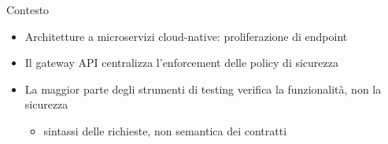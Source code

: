 
\begin{frame}{Contesto}
    \begin{itemize}
        \item Architetture a \alert{microservizi} cloud-native: \alert{proliferazione di endpoint}

        \item Il \alert{gateway API} centralizza l'enforcement delle policy di sicurezza

        \item La maggior parte degli strumenti di testing verifica la \alert{funzionalità}, non la \alert{sicurezza}
              \begin{itemize}
                  \item \alert{sintassi} delle richieste, \alert{non semantica} dei contratti
              \end{itemize}
    \end{itemize}
\end{frame}